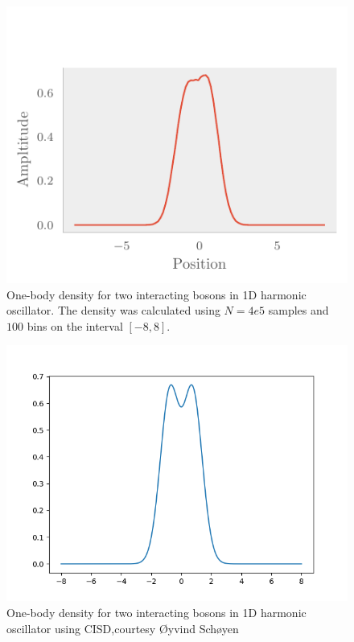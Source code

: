 \begin{figure}[H]
	\includegraphics[]{figures/many_part_int_onebody.pdf}
	\caption{One-body density for two interacting bosons in 1D harmonic oscillator. The density was calculated using $N=4e5$ samples and $100$ bins on the interval $[-8,8]$.}
	\label{fig:many_part_int_onebody}
\end{figure}

\begin{figure}[H]
	\includegraphics[scale = 0.4]{figures/oyvind.png}
	\caption{One-body density for two interacting bosons in 1D harmonic oscillator using CISD,courtesy Øyvind Schøyen}
	\label{fig:many_part_int_onebody}
\end{figure}

